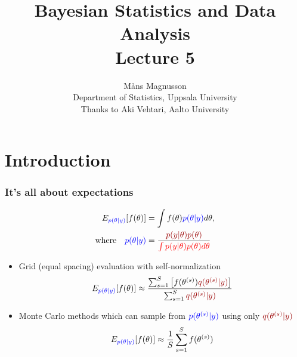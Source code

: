 \documentclass[10pt,handout]{beamer}
\title[]{{\color{black}Bayesian Statistics and Data Analysis \\ Lecture 5}}
\author[]{M{\aa}ns Magnusson \\ Department of Statistics, Uppsala University \\ Thanks to Aki Vehtari, Aalto University}
\date{}
\begin{document}
\frame{\titlepage
}



\section{Introduction}
\frame{\sectionpage}


\begin{frame}

\frametitle{ It's all about expectations}

  \vspace{-1.5\baselineskip}
   \begin{align*}
     E_{\color{blue} p(\theta|y)}[f(\theta)] & = \int f(\theta) {\color{blue} p(\theta|y)} d\theta,\\
     \text{where} \quad
     {\color{blue} p(\theta|y)} & = \frac{\color{uured}p(y|\theta)p(\theta)}{\color{red} \int p(y|\theta)p(\theta) d\theta}
   \end{align*}

 \begin{itemize}
   \vspace{-0.5\baselineskip}
    \item<4-> Grid (equal spacing) evaluation with self-normalization
      \begin{align*}
        E_{\color{blue} p(\theta|y)}[f(\theta)] \approx
        \frac{\sum_{s=1}^S \left[f(\theta^{(s)}){\color{uured}q(\theta^{(s)}|y)}\right]}{\sum_{s=1}^S{\color{uured}q(\theta^{(s)}|y)}}
      \end{align*}
    \item<5-> Monte Carlo methods which can sample from
      ${\color{blue}p(\theta^{(s)}|y)}$ using only
      ${\color{uured}q(\theta^{(s)}|y)}$
         \vspace{-0.5\baselineskip}
      \begin{align*}
        E_{\color{blue} p(\theta|y)}[f(\theta)] \approx \frac{1}{S} \sum_{s=1}^S f(\theta^{(s)})
      \end{align*}
    \end{itemize}

\end{frame}
\end{document}
